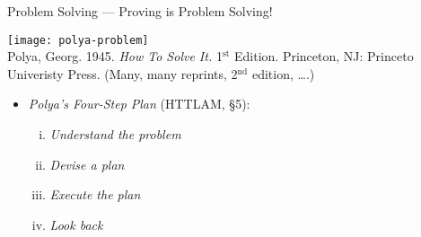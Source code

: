 \documentclass[../slides.tex]{subfiles}
\begin{document}
\begin{frame}{Problem Solving --- Proving is Problem Solving!}

\begin{center}
		\texttt{[image: polya-problem]}\\
		Polya, Georg. 1945. \emph{How To Solve It.} 1$^\text{st}$ Edition. Princeton, NJ: Princeto Univeristy Press. (Many, many reprints, 2$^\text{nd}$ edition, \dots.)
		\end{center}

	\begin{itemize}
		
		\item \emph{Polya's Four-Step Plan} (HTTLAM, \S5):
		
			\begin{enumerate}[(i)]
			
				\item \emph{Understand the problem}
				
					
				
				\item \emph{Devise a plan}
				
					
				
				\item \emph{Execute the plan}
				
				
				
				\item \emph{Look back}
			
			\end{enumerate}

	\end{itemize}
	
\end{frame}
\end{document}
